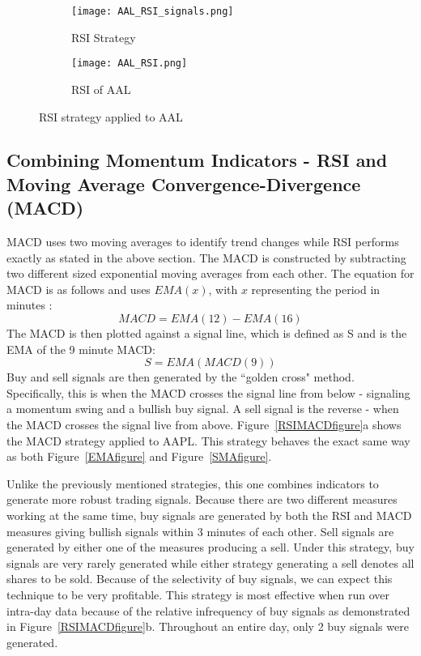 \documentclass[../thesis.tex]{subfiles}
\begin{document}
\begin{figure}[h]
\centering

\begin{subfigure}[t]{0.45\textwidth}
\texttt{[image: AAL\_RSI\_signals.png]}
\caption{RSI Strategy \label{overflow}}
\end{subfigure}
\begin{subfigure}[t]{0.45\textwidth}
\texttt{[image: AAL\_RSI.png]}
\caption{ RSI of AAL \label{overflow}}
\end{subfigure}

\caption{RSI strategy applied to AAL  \label{overflow}}
\label{RSIfigure}
\end{figure}

\subsection{Combining Momentum Indicators - RSI and Moving Average Convergence-Divergence (MACD)}

MACD uses two moving averages to identify trend changes while RSI performs exactly as stated in the above section. The MACD is constructed by subtracting two different sized exponential moving averages from each other. The equation for MACD is as follows and uses $EMA(x)$, with $x$ representing the period in minutes \cite{Chong2014}: \[ MACD = EMA(12) - EMA(16)\] The MACD is then plotted against a signal line, which is defined as S and is the EMA of the 9 minute MACD: \[ S = EMA(MACD(9)) \] Buy and sell signals are then generated by the ``golden cross" method. Specifically, this is when the MACD crosses the signal line from below - signaling a momentum swing and a bullish buy signal. A sell signal is the reverse - when the MACD crosses the signal live from above. Figure~\ref{RSIMACDfigure}a shows the MACD strategy applied to AAPL. This strategy behaves the exact same way as both Figure~\ref{EMAfigure} and Figure~\ref{SMAfigure}.

Unlike the previously mentioned strategies, this one combines indicators to generate more robust trading signals. Because there are two different measures working at the same time, buy signals are generated by both the RSI and MACD measures giving bullish signals within 3 minutes of each other. Sell signals are generated by either one of the measures producing a sell. Under this strategy, buy signals are very rarely generated while either strategy generating a sell denotes all shares to be sold. Because of the selectivity of buy signals, we can expect this technique to be very profitable. This strategy is most effective when run over intra-day data because of the relative infrequency of buy signals as demonstrated in Figure~\ref{RSIMACDfigure}b. Throughout an entire day, only 2 buy signals were generated. 
\end{document}
